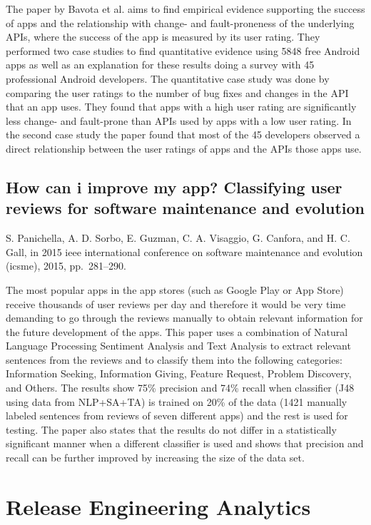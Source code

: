 \documentclass[]{book}
\begin{document}
The paper by Bavota et al. aims to find empirical evidence supporting
the success of apps and the relationship with change- and
fault-proneness of the underlying APIs, where the success of the app is
measured by its user rating. They performed two case studies to find
quantitative evidence using 5848 free Android apps as well as an
explanation for these results doing a survey with 45 professional
Android developers. The quantitative case study was done by comparing
the user ratings to the number of bug fixes and changes in the API that
an app uses. They found that apps with a high user rating are
significantly less change- and fault-prone than APIs used by apps with a
low user rating. In the second case study the paper found that most of
the 45 developers observed a direct relationship between the user
ratings of apps and the APIs those apps use.

\section{How can i improve my app? Classifying user reviews for software
maintenance and
evolution}\label{how-can-i-improve-my-app-classifying-user-reviews-for-software-maintenance-and-evolution}

S. Panichella, A. D. Sorbo, E. Guzman, C. A. Visaggio, G. Canfora, and
H. C. Gall, in 2015 ieee international conference on software
maintenance and evolution (icsme), 2015, pp.~281--290.

The most popular apps in the app stores (such as Google Play or App
Store) receive thousands of user reviews per day and therefore it would
be very time demanding to go through the reviews manually to obtain
relevant information for the future development of the apps. This paper
uses a combination of Natural Language Processing Sentiment Analysis and
Text Analysis to extract relevant sentences from the reviews and to
classify them into the following categories: Information Seeking,
Information Giving, Feature Request, Problem Discovery, and Others. The
results show 75\% precision and 74\% recall when classifier (J48 using
data from NLP+SA+TA) is trained on 20\% of the data (1421 manually
labeled sentences from reviews of seven different apps) and the rest is
used for testing. The paper also states that the results do not differ
in a statistically significant manner when a different classifier is
used and shows that precision and recall can be further improved by
increasing the size of the data set.

\chapter{Release Engineering
Analytics}\label{release-engineering-analytics}
\end{document}
